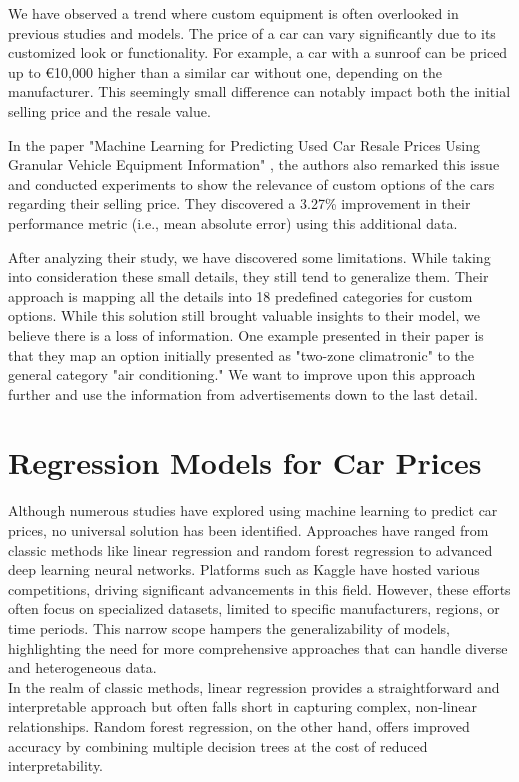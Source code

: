 We have observed a trend where custom equipment is often overlooked in previous studies and models. The price of a car can vary significantly due to its customized look or functionality. For example, a car with a sunroof can be priced up to €10,000 higher than a similar car without one, depending on the manufacturer. This seemingly small difference can notably impact both the initial selling price and the resale value.

In the paper "Machine Learning for Predicting Used
Car Resale Prices Using Granular Vehicle Equipment Information" \cite{granular}, the authors also remarked this issue and conducted experiments to show the relevance of custom options of the cars regarding their selling price. They discovered a 3.27\% improvement in their performance metric (i.e., mean absolute error) using this additional data.

After analyzing their study, we have discovered some limitations. While taking into consideration these small details, they still tend to generalize them. Their approach is mapping all the details into 18 predefined categories for custom options. While this solution still brought valuable insights to their model, we believe there is a loss of information. One example presented in their paper is that they map an option initially presented as "two-zone climatronic" to the general category "air conditioning." We want to improve upon this approach further and use the information from advertisements down to the last detail.

\section{Regression Models for Car Prices}
Although numerous studies have explored using machine learning to predict car prices, no universal solution has been identified. Approaches have ranged from classic methods like linear regression and random forest regression to advanced deep learning neural networks. Platforms such as Kaggle \cite{kaggle} have hosted various competitions, driving significant advancements in this field. However, these efforts often focus on specialized datasets, limited to specific manufacturers, regions, or time periods. This narrow scope hampers the generalizability of models, highlighting the need for more comprehensive approaches that can handle diverse and heterogeneous data.
\\

In the realm of classic methods, linear regression provides a straightforward and interpretable approach but often falls short in capturing complex, non-linear relationships. Random forest regression, on the other hand, offers improved accuracy by combining multiple decision trees at the cost of reduced interpretability.
\\

